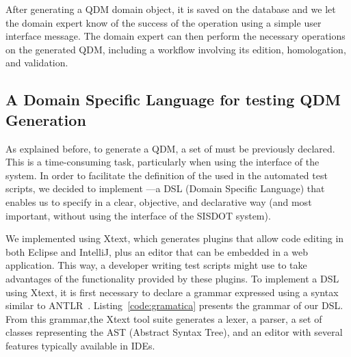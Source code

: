 After generating a QDM domain object, it is saved on the database and we let the domain expert know of the success of the operation using a simple user interface message. The domain expert can then perform the necessary operations on the generated QDM, including a workflow involving  its edition, homologation, and validation.  





\subsection{A Domain Specific Language for testing QDM Generation}

As explained before, to generate a QDM, a set of \callers must be previously declared. This is a time-consuming task, particularly when using the interface of the system. In order to facilitate the definition of the \callers used in the automated test scripts, we decided to implement \hlrdsl---a DSL (Domain Specific Language) that enables us to specify \callers in a clear, objective, and declarative way (and most important, without using the interface of the SISDOT system). 

We implemented \hlrdsl  using Xtext, which generates plugins that allow code editing in both Eclipse and IntelliJ, plus an editor that can be embedded in a web application. This way, a developer writing test scripts might use \hlrdsl to take advantages of the functionality provided by these plugins. To implement a DSL using Xtext, it is first necessary to declare a grammar expressed using a syntax similar to ANTLR~\cite{parr2013}. Listing~\ref{code:gramatica} presents the grammar of our DSL. From this grammar,the Xtext tool suite generates a lexer, a parser, a set of classes representing the AST (Abstract Syntax Tree), and an editor with several features typically available in IDEs.


